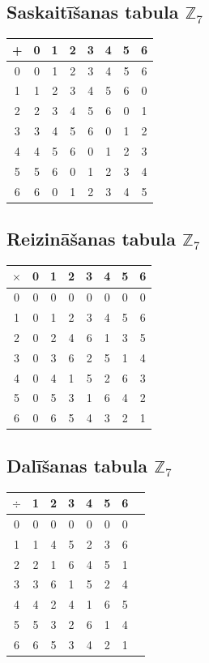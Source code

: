 \documentclass{article}
\begin{document}
\subsection{Saskaitīšanas tabula $\mathbb{Z}_7$}

\begin{tabular}{c|ccccccc}
+ & 0 & 1 & 2 & 3 & 4 & 5 & 6 \\ \hline
0 & 0 & 1 & 2 & 3 & 4 & 5 & 6 \\
1 & 1 & 2 & 3 & 4 & 5 & 6 & 0 \\
2 & 2 & 3 & 4 & 5 & 6 & 0 & 1 \\
3 & 3 & 4 & 5 & 6 & 0 & 1 & 2 \\
4 & 4 & 5 & 6 & 0 & 1 & 2 & 3 \\
5 & 5 & 6 & 0 & 1 & 2 & 3 & 4 \\
6 & 6 & 0 & 1 & 2 & 3 & 4 & 5 \\
\end{tabular}


\subsection{Reizināšanas tabula $\mathbb{Z}_7$}

\begin{tabular}{c|ccccccc}
$\times$ & 0 & 1 & 2 & 3 & 4 & 5 & 6 \\ \hline
0 & 0 & 0 & 0 & 0 & 0 & 0 & 0 \\
1 & 0 & 1 & 2 & 3 & 4 & 5 & 6 \\
2 & 0 & 2 & 4 & 6 & 1 & 3 & 5 \\
3 & 0 & 3 & 6 & 2 & 5 & 1 & 4 \\
4 & 0 & 4 & 1 & 5 & 2 & 6 & 3 \\
5 & 0 & 5 & 3 & 1 & 6 & 4 & 2 \\
6 & 0 & 6 & 5 & 4 & 3 & 2 & 1 \\
\end{tabular}

\subsection{Dalīšanas tabula $\mathbb{Z}_7$}

\begin{tabular}{c|ccccccc}
$\div$ & 1 & 2 & 3 & 4 & 5 & 6 \\ \hline
0 & 0 & 0 & 0 & 0 & 0 & 0 \\
1 & 1 & 4 & 5 & 2 & 3 & 6 \\
2 & 2 & 1 & 6 & 4 & 5 & 1 \\
3 & 3 & 6 & 1 & 5 & 2 & 4 \\
4 & 4 & 2 & 4 & 1 & 6 & 5 \\
5 & 5 & 3 & 2 & 6 & 1 & 4 \\
6 & 6 & 5 & 3 & 4 & 2 & 1 \\
\end{tabular}
\end{document}
